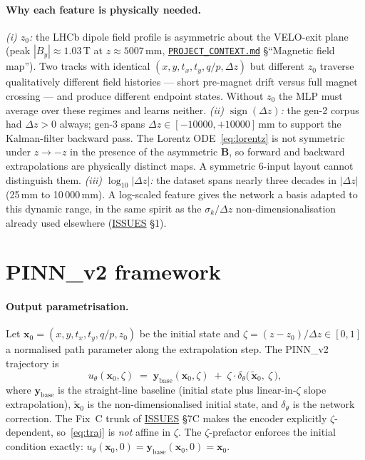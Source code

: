 \documentclass[11pt,a4paper]{article}
\newcommand{\qop}{q/p}
\newcommand{\dz}{\Delta z}
\newcommand{\Bfield}{\mathbf{B}}
\begin{document}
\paragraph{Why each feature is physically needed.}
\emph{(i) $z_0$:} the LHCb dipole field profile is asymmetric about the
VELO-exit plane (peak $|B_y|\approx 1.03$\,T at $z\approx 5007$\,mm,
\href{run:../../PROJECT_CONTEXT.md}{\texttt{PROJECT\_CONTEXT.md}}
§``Magnetic field map''). Two tracks with identical
$(x, y, t_x, t_y, \qop, \dz)$ but different $z_0$ traverse qualitatively
different field histories --- short pre-magnet drift versus full magnet
crossing --- and produce different endpoint states. Without $z_0$ the MLP
must average over these regimes and learns neither.
\emph{(ii) $\operatorname{sign}(\dz)$:} the gen-2 corpus had $\dz>0$
always; gen-3 spans $\dz \in [-10000, +10000]$\,mm to support the
Kalman-filter backward pass. The Lorentz ODE~\eqref{eq:lorentz} is not
symmetric under $z\to -z$ in the presence of the asymmetric $\Bfield$, so
forward and backward extrapolations are physically distinct maps.
A symmetric 6-input layout cannot distinguish them.
\emph{(iii) $\log_{10}|\dz|$:} the dataset spans nearly three decades in
$|\dz|$ (25\,mm to 10\,000\,mm). A log-scaled feature gives the network a
basis adapted to this dynamic range, in the same spirit as the
$\sigma_k/\dz$ non-dimensionalisation already used elsewhere
(\href{run:../../experiments/gen_2/ISSUES_WITH_PINNS_AND_RK_PINNS.md}{ISSUES} §1).

\section{PINN\_v2 framework}\label{sec:pinn_v2}

\paragraph{Output parametrisation.} Let
$\mathbf{x}_0 = (x, y, t_x, t_y, \qop, z_0)$ be the initial state and
$\zeta = (z-z_0)/\dz \in [0,1]$ a normalised path parameter along the
extrapolation step. The PINN\_v2 trajectory is
\begin{equation}\label{eq:traj}
u_\theta(\mathbf{x}_0, \zeta)
\;=\;
\mathbf{y}_\mathrm{base}(\mathbf{x}_0, \zeta)
\;+\;
\zeta \cdot \delta_\theta\!\big(\,\widetilde{\mathbf{x}}_0,\ \zeta\,\big),
\end{equation}
where $\mathbf{y}_\mathrm{base}$ is the straight-line baseline (initial
state plus linear-in-$\zeta$ slope extrapolation),
$\widetilde{\mathbf{x}}_0$ is the non-dimensionalised initial state, and
$\delta_\theta$ is the network correction. The Fix~C trunk of
\href{run:../../experiments/gen_2/ISSUES_WITH_PINNS_AND_RK_PINNS.md}{ISSUES} §7C
makes the encoder explicitly $\zeta$-dependent, so~\eqref{eq:traj} is
\emph{not} affine in $\zeta$. The $\zeta$-prefactor enforces the initial
condition exactly: $u_\theta(\mathbf{x}_0, 0) = \mathbf{y}_\mathrm{base}(\mathbf{x}_0, 0) = \mathbf{x}_0$.
\end{document}
